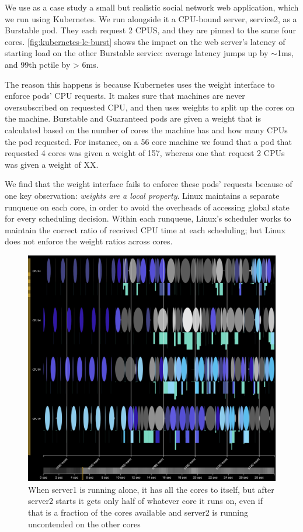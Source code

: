 We use as a case study a small but realistic social network web application,
which we run using Kubernetes. We run alongside it a CPU-bound server, service2,
as a Burstable pod. They each request 2 CPUS, and they are pinned to the same
four cores. \autoref{fig:kubernetes-lc-burst} shows the impact on the web
server's latency of starting load on the other Burstable service: average
latency jumps up by $\sim$1ms, and 99th pctile by > 6ms.

The reason this happens is because Kubernetes uses the \cgroups{} weight
interface to enforce pods' CPU requests. It makes sure that machines are never
oversubscribed on requested CPU, and then uses weights to split up the cores on
the machine. Burstable and Guaranteed pods are given a weight that is calculated
based on the number of cores the machine has and how many CPUs the pod
requested. For instance, on a 56 core machine we found that a pod that requested
4 cores was given a weight of 157, whereas one that request 2 CPUs was given a
weight of XX.

We find that the weight interface fails to enforce these pods' requests because
of one key observation: \textit{weights are a local property}. Linux maintains a
separate runqueue on each core, in order to avoid the overheads of accessing
global state for every scheduling decision. Within each runqueue, Linux's
scheduler works to maintain the correct ratio of received CPU time at each
scheduling; but Linux does not enforce the weight ratios across cores.

\begin{figure}[t]
    \centering
    \includegraphics[width=\columnwidth]{graphs/schedviz-lc-burst-problem.png}
    \caption{When server1 is running alone, it has all the cores to itself, but
    after server2 starts it gets only half of whatever core it runs on, even if
    that is a fraction of the cores available and server2 is running uncontended
    on the other cores}\label{fig:schedviz-lc-burst-problem}
\end{figure}


